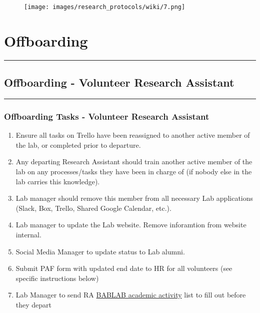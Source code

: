 \documentclass[
]{book}
\providecommand{\tightlist}{%
  \setlength{\itemsep}{0pt}\setlength{\parskip}{0pt}}
\begin{document}
\begin{figure}
\centering
\texttt{[image: images/research\_protocols/wiki/7.png]}
\caption{}
\end{figure}

\hypertarget{offboarding}{%
\chapter{Offboarding}\label{offboarding}}

\begin{center}\rule{0.5\linewidth}{0.5pt}\end{center}

\hypertarget{offboarding---volunteer-research-assistant}{%
\section{Offboarding - Volunteer Research Assistant}\label{offboarding---volunteer-research-assistant}}

\begin{center}\rule{0.5\linewidth}{0.5pt}\end{center}

\hypertarget{offboarding-tasks---volunteer-research-assistant}{%
\subsection{Offboarding Tasks - Volunteer Research Assistant}\label{offboarding-tasks---volunteer-research-assistant}}

\begin{enumerate}
\def\labelenumi{\arabic{enumi}.}
\tightlist
\item
  Ensure all tasks on Trello have been reassigned to another active member of the lab, or completed prior to departure.
\item
  Any departing Research Assistant should train another active member of the lab on any processes/tasks they have been in charge of (if nobody else in the lab carries this knowledge).
\item
  Lab manager should remove this member from all necessary Lab applications (Slack, Box, Trello, Shared Google Calendar, etc.).
\item
  Lab manager to update the Lab website. Remove inforamtion from website internal.
\item
  Social Media Manager to update status to Lab alumni.
\item
  Submit PAF form with updated end date to HR for all volunteers (see specific instructions below)
\item
  Lab Manager to send RA \href{https://docs.google.com/spreadsheets/d/1BDrPZkQR2k0A2yIzCgjrRj-ve8a-tWYQdN2QSSsppbQ/edit?usp=sharing}{BABLAB academic activity} list to fill out before they depart
\end{enumerate}
\end{document}
